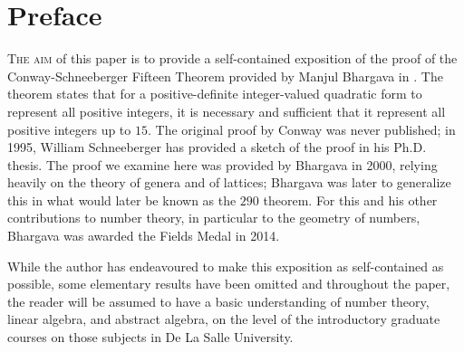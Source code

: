 \chapter*{Preface}

{\scshape The aim} of this paper is to provide a self-contained exposition of the proof of the Conway-Schneeberger Fifteen Theorem provided by Manjul Bhargava in \cite{bhargava2000conway}. The theorem states that for a positive-definite integer-valued quadratic form to represent all positive integers, it is necessary and sufficient that it represent all positive integers up to \(15\). The original proof by Conway was never published; in 1995, William Schneeberger has provided a sketch of the proof in his Ph.D. thesis. \cite{schneeberger1997arithmetic} The proof we examine here was provided by Bhargava in 2000, relying heavily on the theory of genera and of lattices; Bhargava was later to generalize this in what would later be known as the \(290\) theorem. \cite{bhargava2005universal} For this and his other contributions to number theory, in particular to the geometry of numbers, Bhargava was awarded the Fields Medal in 2014. \cite{bhargava2014fields}

While the author has endeavoured to make this exposition as self-contained as possible, some elementary results have been omitted and throughout the paper, the reader will be assumed to have a basic understanding of number theory, linear algebra, and abstract algebra, on the level of the introductory graduate courses on those subjects in De La Salle University. 

